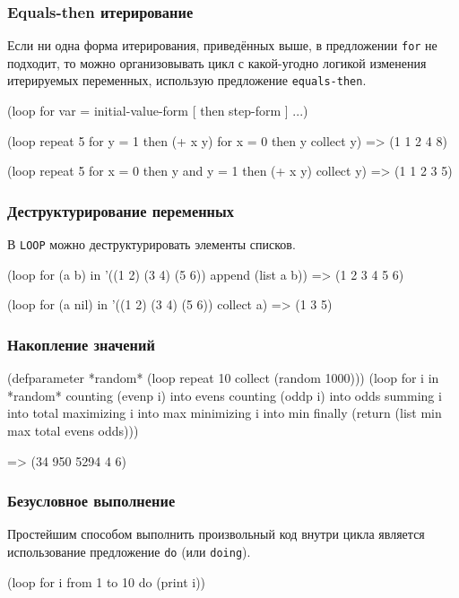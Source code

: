\subsubsection{Equals-then итерирование}
Если ни одна форма итерирования, приведённых выше, в предложении \lstinline{for} не подходит, то можно организовывать цикл с какой-угодно логикой изменения итерируемых переменных, использую предложение \lstinline{equals-then}.
\begin{cllst}{}{}
(loop for var = initial-value-form [ then step-form ] ...)

(loop repeat 5
   for y = 1 then (+ x y)
   for x = 0 then y
   collect y) => (1 1 2 4 8)

(loop repeat 5 
   for x = 0 then y
   and y = 1 then (+ x y)
   collect y) => (1 1 2 3 5)
\end{cllst}

\subsubsection{Деструктурирование переменных}
В \lstinline{LOOP} можно деструктурировать элементы списков.
\begin{cllst}{}{}
(loop for (a b) in '((1 2) (3 4) (5 6))
   append (list a b))                      => (1 2 3 4 5 6)

(loop for (a nil) in '((1 2) (3 4) (5 6)) collect a) => (1 3 5)
\end{cllst}

\subsubsection{Накопление значений}
\begin{cllst}{}{}
(defparameter *random* (loop repeat 10 collect (random 1000)))
(loop for i in *random*
   counting (evenp i) into evens
   counting (oddp i) into odds
   summing i into total
   maximizing i into max
   minimizing i into min
   finally (return (list min max total evens odds)))

=> (34 950 5294 4 6)
\end{cllst}

\subsubsection{Безусловное выполнение}
Простейшим способом выполнить произвольный код внутри цикла является использование предложение \lstinline{do} (или \lstinline{doing}).
\begin{cllst}{}{}
(loop for i from 1 to 10 do (print i))
\end{cllst}

